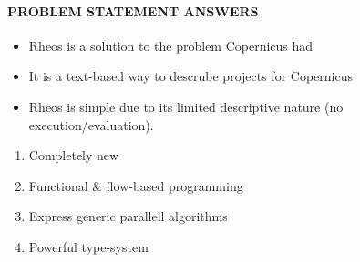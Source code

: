 \paragraph{PROBLEM STATEMENT ANSWERS}
\begin{itemize}
\item Rheos is a solution to the problem Copernicus had
\item It is a text-based way to descrube projects for Copernicus
\item Rheos is simple due to its limited descriptive nature (no
  execution/evaluation).
\end{itemize}

\begin{enumerate}
\item Completely new
\item Functional \& flow-based programming
\item Express generic parallell algorithms
\item Powerful type-system
\end{enumerate}
